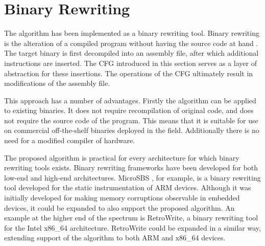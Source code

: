 \section{Binary Rewriting}
\label{sec:rewriting}
The algorithm has been implemented as a binary rewriting tool. 
Binary rewriting is the alteration of a compiled program without having the source code at hand \cite{rewriting-survey}.
The target binary is first decompiled into an assembly file, after which additional instructions are inserted. 
The CFG introduced in this section serves as a layer of abstraction for these insertions. 
The operations of the CFG ultimately result in modifications of the assembly file. 

This approach has a number of advantages. 
Firstly the algorithm can be applied to existing binaries. It does not require recompilation of original code, and does not require the source code of the program. 
This means that it is suitable for use on commercial off-the-shelf binaries deployed in the field. 
Additionally there is no need for a modified compiler of hardware. 

The proposed algorithm is practical for every architecture for which binary rewriting tools exists. Binary rewriting frameworks have been developed for both low-end and high-end architectures. 
MicroSBS \cite{microsbs}, for example, is a binary rewriting tool developed for the static instrumentation of ARM devices. Although it was initially developed for making memory corruptions observable in embedded devices, it 
could be expanded to also support the proposed algorithm. An example at the higher end of the spectrum is RetroWrite, a binary rewriting tool for the Intel x86\_64 architecture.
RetroWrite could be expanded in a similar way, extending support of the algorithm to both ARM and x86\_64 devices. 
